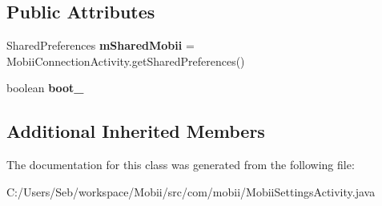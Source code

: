 \subsection*{Public Attributes}
\begin{DoxyCompactItemize}
\item 
\hypertarget{classcom_1_1mobii_1_1_mobii_settings_activity_a9233e76f54793fe4cf5f5b53766c3216}{Shared\-Preferences {\bfseries m\-Shared\-Mobii} = Mobii\-Connection\-Activity.\-get\-Shared\-Preferences()}\label{classcom_1_1mobii_1_1_mobii_settings_activity_a9233e76f54793fe4cf5f5b53766c3216}

\item 
\hypertarget{classcom_1_1mobii_1_1_mobii_settings_activity_ab387858f94e08d1c52a9928b3fe32c6d}{boolean {\bfseries boot\-\_\-}}\label{classcom_1_1mobii_1_1_mobii_settings_activity_ab387858f94e08d1c52a9928b3fe32c6d}

\end{DoxyCompactItemize}
\subsection*{Additional Inherited Members}


The documentation for this class was generated from the following file\-:\begin{DoxyCompactItemize}
\item 
C\-:/\-Users/\-Seb/workspace/\-Mobii/src/com/mobii/Mobii\-Settings\-Activity.\-java\end{DoxyCompactItemize}
